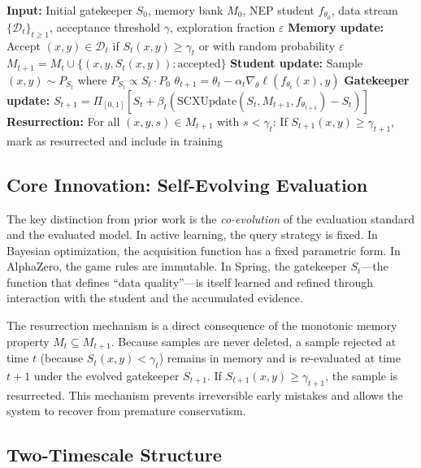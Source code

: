 \documentclass[11pt,a4paper]{article}
\theoremstyle{plain}
\theoremstyle{definition}
\theoremstyle{remark}
\newcommand{\D}{\mathcal{D}}
\begin{document}
\begin{algorithm}[ht]
\caption{Spring Self-Evolving Gatekeeper}
\label{alg:spring}
\begin{algorithmic}[1]
\State \textbf{Input:} Initial gatekeeper $S_0$, memory bank $M_0$, NEP student $f_{\theta_0}$, data stream $\{\D_t\}_{t \geq 1}$, acceptance threshold $\gamma$, exploration fraction $\varepsilon$
    \State \textbf{Memory update:} Accept $(x,y) \in \D_{t}$ if $S_t(x,y) \geq \gamma_t$ or with random probability $\varepsilon$
    \State $M_{t+1} = M_t \cup \{(x, y, S_t(x,y)) : \text{accepted}\}$
    \State \textbf{Student update:} Sample $(x, y) \sim P_{S_t}$ where $P_{S_t} \propto S_t \cdot P_0$
    \State $\theta_{t+1} = \theta_t - \alpha_t \nabla_\theta \ell(f_{\theta_t}(x), y)$
    \State \textbf{Gatekeeper update:} $S_{t+1} = \Pi_{[0,1]}[S_t + \beta_t (\text{SCXUpdate}(S_t, M_{t+1}, f_{\theta_{t+1}}) - S_t)]$
    \State \textbf{Resurrection:} For all $(x, y, s) \in M_{t+1}$ with $s < \gamma_t$:
    \State \quad If $S_{t+1}(x,y) \geq \gamma_{t+1}$, mark as resurrected and include in training
\EndFor
\end{algorithmic}
\end{algorithm}

\subsection{Core Innovation: Self-Evolving Evaluation}

The key distinction from prior work is the \emph{co-evolution} of the evaluation standard and the evaluated model. In active learning, the query strategy is fixed. In Bayesian optimization, the acquisition function has a fixed parametric form. In AlphaZero, the game rules are immutable. In Spring, the gatekeeper $S_t$---the function that defines ``data quality''---is itself learned and refined through interaction with the student and the accumulated evidence.

The resurrection mechanism is a direct consequence of the monotonic memory property $M_t \subseteq M_{t+1}$. Because samples are never deleted, a sample rejected at time $t$ (because $S_t(x,y) < \gamma_t$) remains in memory and is re-evaluated at time $t+1$ under the evolved gatekeeper $S_{t+1}$. If $S_{t+1}(x,y) \geq \gamma_{t+1}$, the sample is resurrected. This mechanism prevents irreversible early mistakes and allows the system to recover from premature conservatism.

\subsection{Two-Timescale Structure}
\end{document}
